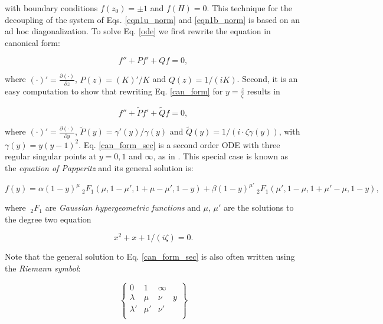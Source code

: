 %
with boundary conditions $f(z_0)=\pm 1$ and $f(H) = 0$.
This technique for the decoupling of the system of Eqs. \ref{eqn1u_norm} and \ref{eqn1b_norm} is based on an ad hoc diagonalization.
%
To solve Eq. \ref{ode} we first rewrite the equation in canonical form:
%
\begin{linenomath*}
\begin{equation}
	\label{can_form}
	f''+P f'+ Qf =0,
\end{equation}
\end{linenomath*}
%
where $(\cdot)' = \frac{\partial (\cdot)}{\partial z}$, $P(z)=(K)'/K$ and $Q(z)=1/(i K)$. Second, it is an easy computation to show that rewriting Eq. \ref{can_form} for $y = \frac{z }{\zeta}
$ results in
%
\begin{linenomath*}
\begin{equation}
	\label{can_form_sec}
	f''+\widetilde{P} f'+ \widetilde{Q} f =0,
\end{equation}
\end{linenomath*}
%
where $(\cdot)' = \frac{\partial (\cdot)}{\partial y}$, $\widetilde{P}(y)=\gamma'(y)/\gamma(y)$ and $\widetilde{Q}(y)=1/( i \cdot \zeta \gamma(y))$, with $\gamma(y)=y(y-1)^2$.
Eq. \ref{can_form_sec} is a second order ODE with three regular singular points at $y = 0,1$ and $\infty$, as in \citet{Morse1954a}. 
This special case is known as the \emph{equation of Papperitz} and its general solution is:
%
\begin{linenomath*}
\begin{equation}
	f(y) = \alpha (1-y)^\mu \ _2F_1 (\mu, 1- \mu', 1+\mu-\mu', 1-y)
	+\beta (1-y)^{\mu'} \ _2F_1 (\mu', 1- \mu, 1+\mu'-\mu, 1-y),
	\label{gen_sol_g}
\end{equation}
\end{linenomath*}
%
where $\ _2F_1$ are \emph{Gaussian hypergeometric functions} and $\mu$, $\mu'$ are the solutions to the degree two equation
%
\begin{linenomath*}
\begin{equation*}
	x^2+x+1/( i \zeta)=0.
\end{equation*}
\end{linenomath*}
%
Note that the general solution to Eq. \ref{can_form_sec} is also often written using the \emph{Riemann symbol}:
%
\begin{linenomath*}
\begin{equation*}
\left \{
\begin{array}{cccc}
0 & 1 & \infty &  \\
\lambda & \mu & \nu & y\\
\lambda' & \mu' & \nu' & \\
\end{array}
\right \}
\end{equation*}
\end{linenomath*}
